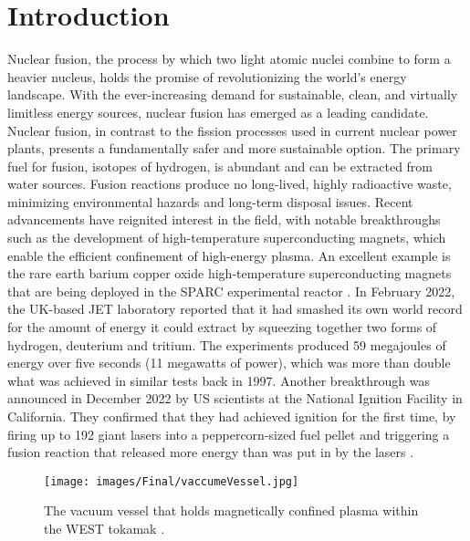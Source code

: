 \chapter{Introduction}
Nuclear fusion, the process by which two light atomic nuclei combine to form a heavier nucleus, holds the promise of revolutionizing the world's energy landscape. With the ever-increasing demand for sustainable, clean, and virtually limitless energy sources, nuclear fusion has emerged as a leading candidate. Nuclear fusion, in contrast to the fission processes used in current nuclear power plants, presents a fundamentally safer and more sustainable option. The primary fuel for fusion, isotopes of hydrogen, is abundant and can be extracted from water sources. Fusion reactions produce no long-lived, highly radioactive waste, minimizing environmental hazards and long-term disposal issues. Recent advancements have reignited interest in the field, with notable breakthroughs such as the development of high-temperature superconducting magnets, which enable the efficient confinement of high-energy plasma. An excellent example is the rare earth barium copper oxide high-temperature superconducting magnets that are being deployed in the SPARC experimental reactor \cite{SPARCoverview}. In February 2022, the UK-based JET laboratory reported that it had smashed its own world record for the amount of energy it could extract by squeezing together two forms of hydrogen, deuterium and tritium. The experiments produced 59 megajoules of energy over five seconds (11 megawatts of power), which was more than double what was achieved in similar tests back in 1997. Another breakthrough was announced in December 2022 by US scientists at the National Ignition Facility in California. They confirmed that they had achieved ignition for the first time, by firing up to 192 giant lasers into a peppercorn-sized fuel pellet and triggering a fusion reaction that released more energy than was put in by the lasers \cite{nationalignitionfacilitycali}.

\begin{figure}[H]
    \centering
    \texttt{[image: images/Final/vaccumeVessel.jpg]}
    \caption{The vacuum vessel that holds magnetically confined plasma within the WEST tokamak \cite{vacves}.}
    \label{fig:vacves}
  \end{figure}

